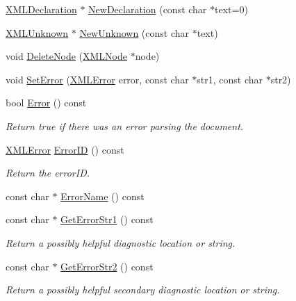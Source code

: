\begin{DoxyCompactItemize}
\hyperlink{classtinyxml2_1_1_x_m_l_declaration}{X\+M\+L\+Declaration} $\ast$ \hyperlink{classtinyxml2_1_1_x_m_l_document_ae519030c0262fa2daff8993681990e16}{New\+Declaration} (const char $\ast$text=0)
\item 
\hyperlink{classtinyxml2_1_1_x_m_l_unknown}{X\+M\+L\+Unknown} $\ast$ \hyperlink{classtinyxml2_1_1_x_m_l_document_a4954f502c5fd7f49de54c3c0c99bb73d}{New\+Unknown} (const char $\ast$text)
\item 
void \hyperlink{classtinyxml2_1_1_x_m_l_document_ac1d6e2c7fcc1a660624ac4f68e96380d}{Delete\+Node} (\hyperlink{classtinyxml2_1_1_x_m_l_node}{X\+M\+L\+Node} $\ast$node)
\item 
void \hyperlink{classtinyxml2_1_1_x_m_l_document_ae38d194e47336e4c96677ac77e2ac5d4}{Set\+Error} (\hyperlink{namespacetinyxml2_a1fbf88509c3ac88c09117b1947414e08}{X\+M\+L\+Error} error, const char $\ast$str1, const char $\ast$str2)
\item 
bool \hyperlink{classtinyxml2_1_1_x_m_l_document_abf0f9ac4c3aa5698a785937f71f7a69f}{Error} () const 
\begin{DoxyCompactList}\small\item\em Return true if there was an error parsing the document. \end{DoxyCompactList}\item 
\hyperlink{namespacetinyxml2_a1fbf88509c3ac88c09117b1947414e08}{X\+M\+L\+Error} \hyperlink{classtinyxml2_1_1_x_m_l_document_a34903418c9e83f27945c2c533839e350}{Error\+I\+D} () const 
\begin{DoxyCompactList}\small\item\em Return the error\+I\+D. \end{DoxyCompactList}\item 
const char $\ast$ \hyperlink{classtinyxml2_1_1_x_m_l_document_a7ff8b68f87042d535841b0afd2c82161}{Error\+Name} () const 
\item 
const char $\ast$ \hyperlink{classtinyxml2_1_1_x_m_l_document_a016ccebecee36fe92084b5dfee6cc072}{Get\+Error\+Str1} () const 
\begin{DoxyCompactList}\small\item\em Return a possibly helpful diagnostic location or string. \end{DoxyCompactList}\item 
const char $\ast$ \hyperlink{classtinyxml2_1_1_x_m_l_document_a88f6b44bd019033bda28abd31fe257b2}{Get\+Error\+Str2} () const 
\begin{DoxyCompactList}\small\item\em Return a possibly helpful secondary diagnostic location or string. \end{DoxyCompactList}\item 

\end{DoxyCompactItemize}

